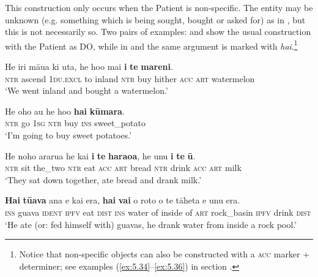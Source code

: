 This construction only occurs when the Patient is non-specific. The entity may be unknown (e.g. something which is being sought, bought or asked for) as in , but this is not necessarily so. Two pairs of examples:  and  show the usual construction with the Patient as DO, while in  and  the same argument is marked with \textit{hai}.\footnote{\label{fn:439}Notice that non-specific objects can also be constructed with a \textsc{acc} marker + determiner; see examples (\ref{ex:5.34}–\ref{ex:5.36}) in section .}

\ea\label{ex:8.130}
\gll He iri māua ki {\ꞌ}uta, he ho{\ꞌ}o mai \textbf{i} \textbf{te} \textbf{mareni}. \\
\textsc{ntr} ascend \textsc{1du.excl} to inland \textsc{ntr} buy hither \textsc{acc} \textsc{art} watermelon \\

\glt 
‘We went inland and bought a watermelon.’ \textstyleExampleref{[R121.070]} 
\z

\ea\label{ex:8.131}
\gll He oho au he ho{\ꞌ}o \textbf{hai} \textbf{kūmara}.\\
\textsc{ntr} go \textsc{1sg} \textsc{ntr} buy \textsc{ins} sweet\_potato\\

\glt 
‘I’m going to buy sweet potatoes.’ \textstyleExampleref{[Notes]}
\z

\ea\label{ex:8.132}
\gll He noho ararua he kai \textbf{i} \textbf{te} \textbf{haraoa}, he unu \textbf{i} \textbf{te} \textbf{ū}. \\
\textsc{ntr} sit the\_two \textsc{ntr} eat \textsc{acc} \textsc{art} bread \textsc{ntr} drink \textsc{acc} \textsc{art} milk \\

\glt 
‘They sat down together, ate bread and drank milk.’ \textstyleExampleref{[R334.119]} 
\z

\ea\label{ex:8.133}
\gll \textbf{Hai} \textbf{tūava} {\ꞌ}ana e kai era, \textbf{hai} \textbf{vai} o roto o te tāheta e unu era.\\
\textsc{ins} guava \textsc{ident} \textsc{ipfv} eat \textsc{dist} \textsc{ins} water of inside of \textsc{art} rock\_basin \textsc{ipfv} drink \textsc{dist}\\

\glt 
‘He ate (or: fed himself with) guavas, he drank water from inside a rock pool.’ \textstyleExampleref{[R439.014]} 
\z

